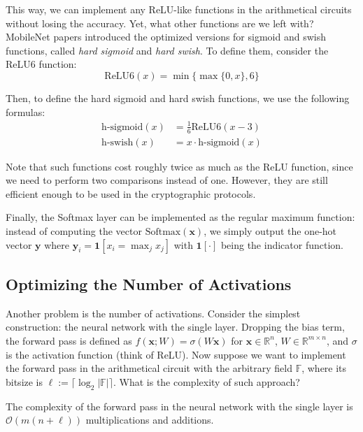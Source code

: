 \documentclass{iacrtrans}
\begin{document}
This way, we can implement any ReLU-like functions in the arithmetical circuits
without losing the accuracy. Yet, what other functions are we left with?
MobileNet papers \cite{mobilenetv2,mobilenetv3} introduced the optimized
versions for sigmoid and swish functions, called \textit{hard sigmoid} and
\textit{hard swish}. To define them, consider the ReLU6 function:
\begin{equation*}
    \text{ReLU6}(x) = \min\{\max\{0,x\},6\}
\end{equation*}

Then, to define the hard sigmoid and hard swish functions, we use the following
formulas:
\begin{align*}
    \text{h-sigmoid}(x) &= \frac{1}{6}\text{ReLU6}(x-3) \\
    \text{h-swish}(x) &= x \cdot \text{h-sigmoid}(x)
\end{align*}

Note that such functions cost roughly twice as much as the ReLU function, since 
we need to perform two comparisons instead of one. However, they are still
efficient enough to be used in the cryptographic protocols.

Finally, the Softmax layer can be implemented as the regular maximum function:
instead of computing the vector $\textrm{Softmax}(\mathbf{x})$, we simply output
the one-hot vector $\mathbf{y}$ where $\mathbf{y}_i = \mathbf{1}[x_i =
\max_{j}x_j]$ with $\mathbf{1}[\cdot]$ being the indicator function.

\subsection{Optimizing the Number of Activations}

Another problem is the number of activations. Consider the simplest
construction: the neural network with the single layer. Dropping the bias term,
the forward pass is defined as $f(\mathbf{x}; W) = \sigma(W\mathbf{x})$ for
$\mathbf{x} \in \mathbb{R}^n$, $W \in \mathbb{R}^{m \times n}$, and $\sigma$ is
the activation function (think of ReLU). Now suppose we want to implement the
forward pass in the arithmetical circuit with the arbitrary field $\mathbb{F}$,
where its bitsize is $\ell := \lceil \log_2 |\mathbb{F}| \rceil$. What is the
complexity of such approach?

\begin{proposition}
    The complexity of the forward pass in the neural network with the single
    layer is $\mathcal{O}(m(n+\ell))$ multiplications and
    additions.
\end{proposition}
\end{document}
